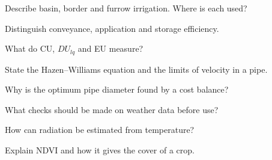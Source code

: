 \begin{exlist}
\item Describe basin, border and furrow irrigation. Where is each used?
\item Distinguish conveyance, application and storage efficiency.
\item What do CU, $DU_{lq}$ and EU measure?
\item State the Hazen--Williams equation and the limits of velocity in a pipe.
\item Why is the optimum pipe diameter found by a cost balance?
\item What checks should be made on weather data before use?
\item How can radiation be estimated from temperature?
\item Explain NDVI and how it gives the cover of a crop.
\end{exlist}
